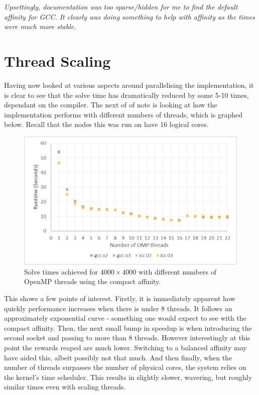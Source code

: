 \documentclass[11pt,twocolumn,a4paper]{article}
\begin{document}
\small\textit{Upsettingly, documentation was too sparse/hidden for me to find the default affinity for \textit{GCC}. It clearly was doing something to help with affinity as the times were much more stable.}


\section{Thread Scaling}
Having now looked at various aspects around parallelising the implementation, it is clear to see that the solve time has dramatically reduced by some 5-10 times, dependant on the compiler. The next of of note is looking at how the implementation performs with different numbers of threads, which is graphed below. Recall that the nodes this was run on have 16 logical cores.

\begin{figure}[h]
        \centering
        \includegraphics[width=0.8\linewidth]{figures/FINAL-THREAD-SCALING.png}
        \caption{Solve times achieved for $4000\times4000$ with different numbers of OpenMP threads using the compact affinity.}
        \label{fig-6-affin}
\end{figure}

This shows a few points of interest. Firstly, it is immediately apparent how quickly performance increases when there is under 8 threads. It follows an approximately exponential curve - something one would expect to see with the compact affinity. Then, the next small bump in speedup is when introducing the second socket and passing to more than 8 threads. However interestingly at this point the rewards reaped are much lower. Switching to a balanced affinity may have aided this, albeit possibly not that much. And then finally, when the number of threads surpasses the number of physical cores, the system relies on the kernel's time scheduler. This results in slightly slower, wavering, but roughly similar times even with scaling threads. \par
\end{document}
